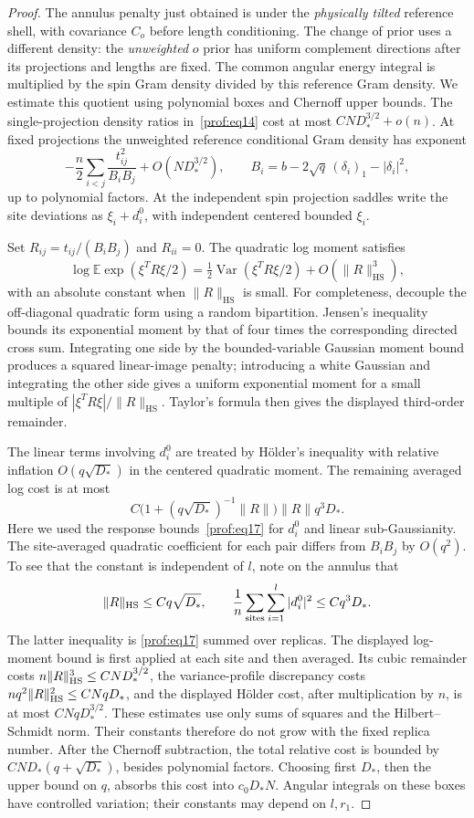 \begin{proof}
The annulus penalty just obtained is under the \emph{physically
tilted} reference shell, with covariance \(C_o\) before length
conditioning. The change of prior uses a different density:
the \emph{unweighted} \(o\) prior has uniform complement directions
after its projections and lengths are fixed. The common angular energy
integral is multiplied by the spin Gram density divided by this reference
Gram density. We estimate this quotient using polynomial boxes and
Chernoff upper bounds.
The single-projection density ratios in~\eqref{prof:eq14} cost at most
\(CN D_*^{3/2}+o(n)\).  At fixed projections the unweighted reference conditional
Gram density has exponent
\[
 -\frac n2\sum_{i<j}\frac{t_{ij}^2}{B_iB_j}
       +O(ND_*^{3/2}),
 \qquad
 B_i=b-2\sqrt q\,(\delta_i)_1-|\delta_i|^2,
\]
up to polynomial factors.  At the independent spin projection saddles
write the site deviations as \(\xi_i+d_i^0\), with independent centered
bounded \(\xi_i\).

Set \(R_{ij}=t_{ij}/(B_iB_j)\) and \(R_{ii}=0\).
The quadratic log moment satisfies
\[
 \log\mathbb E\exp(\xi^TR\xi/2)
  =\tfrac12\operatorname{Var}(\xi^TR\xi/2)
       +O(\|R\|_{\mathrm{HS}}^3),
\]
with an absolute constant when \(\|R\|_{\mathrm{HS}}\) is small.
For completeness, decouple the off-diagonal quadratic form using a random
bipartition.  Jensen's inequality bounds its exponential moment by that
of four times the corresponding directed cross sum.  Integrating one
side by the bounded-variable Gaussian moment bound produces a squared
linear-image penalty; introducing a white Gaussian and integrating the
other side gives a uniform exponential moment for a small multiple of
\(|\xi^TR\xi|/\|R\|_{\mathrm{HS}}\).  Taylor's formula then gives the
displayed third-order remainder.

The linear terms involving \(d_i^0\) are treated by H\"older's inequality
with relative inflation \(O(q\sqrt{D_*})\) in the centered quadratic
moment.  The remaining averaged log cost is at most
\[
 C\bigl(1+(q\sqrt{D_*})^{-1}\|R\|\bigr)
       \|R\|q^3D_*.
\]
Here we used the response bounds~\eqref{prof:eq17} for \(d_i^0\) and linear sub-Gaussianity.
The site-averaged quadratic coefficient for each pair differs from
\(B_iB_j\) by \(O(q^2)\). To see that the constant is independent
of \(l\), note on the annulus that
\[
 \|R\|_{\rm HS}\le Cq\sqrt{D_*},\qquad
 \frac1n\sum_{\text{sites}}\sum_{i=1}^l|d_i^0|^2
 \le Cq^3D_*.
\]
The latter inequality is \eqref{prof:eq17} summed over replicas.
The displayed log-moment bound is first applied at each site and
then averaged. Its cubic remainder costs
\(n\|R\|_{\rm HS}^3\le CN D_*^{3/2}\), the variance-profile
discrepancy costs
\(nq^2\|R\|_{\rm HS}^2\le CNqD_*\), and the displayed
H\"older cost, after multiplication by \(n\), is at most
\(CNqD_*^{3/2}\). These estimates use only sums of squares and
the Hilbert--Schmidt norm. Their constants therefore do not grow
with the fixed replica number. After the Chernoff subtraction, the
total relative cost is bounded by
\(CN D_*(q+\sqrt{D_*})\), besides polynomial factors. Choosing first
\(D_*\), then the upper bound on \(q\), absorbs this cost into
\(c_0D_*N\).  Angular integrals on these boxes have controlled variation;
their constants may depend on \(l,r_1\).


\end{proof}

